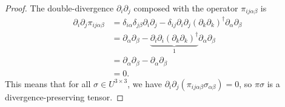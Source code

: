\documentclass[10pt,a4paper]{amsart}
\begin{document}
\begin{proof}
    The double-divergence $\partial_i \partial_j$ composed with the operator
    $\pi_{i j \alpha \beta}$ is
    \begin{equation}
    \begin{split}
        \partial_i \partial_j \pi_{i j \alpha \beta}
        & = \delta_{i \alpha} \delta_{j \beta} \partial_i \partial_j
        - \delta_{i j} \partial_i \partial_j
        \left( \partial_k \partial_k \right)^{\dagger}
        \partial_\alpha \partial_\beta \\
        & = \partial_\alpha \partial_\beta
        - \underbrace{\partial_i \partial_i
        \left( \partial_k \partial_k \right)^{\dagger}}_{1}
        \partial_\alpha \partial_\beta \\
        & = \partial_\alpha \partial_\beta - \partial_\alpha \partial_\beta \\
        & = 0.
    \end{split}
    \end{equation}
    This means that for all $\sigma \in U^{3 \times 3}$, we have
    $\partial_i \partial_j ( \pi_{i j \alpha \beta} \sigma_{\alpha \beta} ) = 0$,
    so $\pi \sigma$ is a divergence-preserving
    tensor.


\end{proof}
\end{document}
